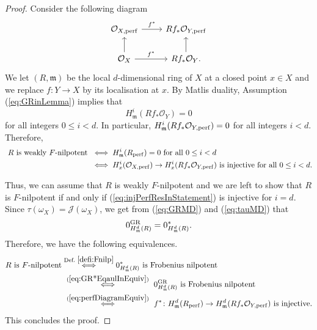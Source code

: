 \documentclass[letterpaper,11pt]{amsart}
\theoremstyle{plain}
\theoremstyle{definition}
\theoremstyle{remark}
\def\cJ{\mathcal{J}}
\def\cO{\mathcal{O}}
\def\m{\mathfrak{m}} %
\begin{document}
\begin{proof}
Consider the following diagram
\begin{equation} \label{eq:perfDiagramEquiv}
\begin{tikzcd}
\cO_{X, {\rm perf}} \ar{r}{f^*} & Rf_*\cO_{Y, {\rm perf}} \\
\cO_X \ar{u} \ar{r}{f^*} & Rf_*\cO_Y \ar{u}.
\end{tikzcd}
\end{equation}
We let $(R,\m)$ be the local $d$-dimensional ring of $X$ at a closed point $x \in X$ and we replace $f \colon Y \to X$ by its localisation at $x$. By Matlis duality, Assumption (\ref{eq:GRinLemma}) implies that
\[
H^i_\m(Rf_*\cO_Y)=0
\]
for all integers $0 \leq i < d$. In particular, $H^i_\m(Rf_*\cO_{Y, {\rm perf}})=0$ for all integers $i<d$. Therefore,
\begin{align*}
\text{ $R$ is weakly $F$-nilpotent } &\iff H^i_\m(R_{\rm perf})=0 \text{ for all $0 \leq i < d$} \\
&\iff H^{i}_x(\cO_{X, {\rm perf}}) \to H^{i}_x(Rf_*\cO_{Y, {\rm perf}}) \text{ is injective for all $0 \leq i < d$.}
\end{align*}

Thus, we can assume that $R$ is weakly $F$-nilpotent and we are left to show that $R$ is $F$-nilpotent if and only if (\ref{eq:injPerfResInStatement}) is injective for $i = d$. Since $\tau(\omega_X) = \cJ(\omega_X)$, we get from (\ref{eq:GRMD}) and (\ref{eq:tauMD}) that
\begin{equation} \label{eq:GR*EqaulInEquiv}
    0^{\rm GR}_{H^d_\m(R)} = 0^{*}_{H^d_\m(R)}. 
\end{equation}
Therefore, we have the following equivalences.
\begin{align*}
\text{$R$ is $F$-nilpotent} &\overset{{\text{Def.\ } \ref{defi:Fnilp}}}{\iff} 0^*_{H^d_\m(R)} \text{ is Frobenius nilpotent} \\
&\ \overset{(\ref{eq:GR*EqaulInEquiv})}{\iff} \  0^{\rm GR}_{H^d_\m(R)} \text{ is Frobenius nilpotent} \\
&\ \overset{(\ref{eq:perfDiagramEquiv})}{\iff} \ f^* \colon H^d_\m(R_{\rm perf}) \to H^d_\m(Rf_*\cO_{Y, {\rm perf}}) \text{ is injective.}
\end{align*}
This concludes the proof.
\end{proof}
\end{document}
